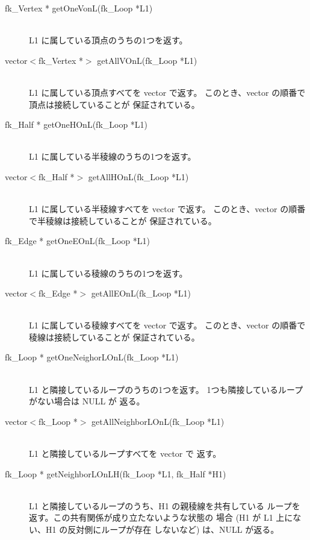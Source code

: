\begin{description}
 \item[\hspace*{0.6cm}fk\_Vertex * getOneVonL(fk\_Loop *L1)] ~ \\
	L1 に属している頂点のうちの1つを返す。

 \item[\hspace*{0.6cm}vector\(<\)fk\_Vertex *\(>\)
	getAllVOnL(fk\_Loop *L1)] ~ \\
	L1 に属している頂点すべてを vector で返す。
	このとき、vector の順番で頂点は接続していることが
	保証されている。

 \item[\hspace*{0.6cm}fk\_Half * getOneHOnL(fk\_Loop *L1)] ~ \\
	L1 に属している半稜線のうちの1つを返す。

 \item[\hspace*{0.6cm}vector\(<\)fk\_Half *\(>\)
	getAllHOnL(fk\_Loop *L1)] ~ \\
	L1 に属している半稜線すべてを vector で返す。
	このとき、vector の順番で半稜線は接続していることが
	保証されている。

 \item[\hspace*{0.6cm}fk\_Edge * getOneEOnL(fk\_Loop *L1)] ~ \\
	L1 に属している稜線のうちの1つを返す。

 \item[\hspace*{0.6cm}vector\(<\)fk\_Edge *\(>\)
	getAllEOnL(fk\_Loop *L1)] ~ \\
	L1 に属している稜線すべてを vector で返す。
	このとき、vector の順番で稜線は接続していることが
	保証されている。

 \item[\hspace*{0.6cm}fk\_Loop * getOneNeighorLOnL(fk\_Loop *L1)] ~ \\
	L1 と隣接しているループのうちの1つを返す。
	1つも隣接しているループがない場合は NULL が
	返る。

 \item[\hspace*{0.6cm}vector\(<\)fk\_Loop *\(>\)
	getAllNeighborLOnL(fk\_Loop *L1)] ~ \\
	L1 と隣接しているループすべてを vector で
	返す。

 \item[\hspace*{0.6cm}fk\_Loop *
	getNeighborLOnLH(fk\_Loop *L1, fk\_Half *H1)] ~ \\
	L1 と隣接しているループのうち、H1 の親稜線を共有している
	ループを返す。この共有関係が成り立たないような状態の
	場合 (H1 が L1 上にない、H1 の反対側にループが存在
	しないなど) は、NULL が返る。


\end{description}
